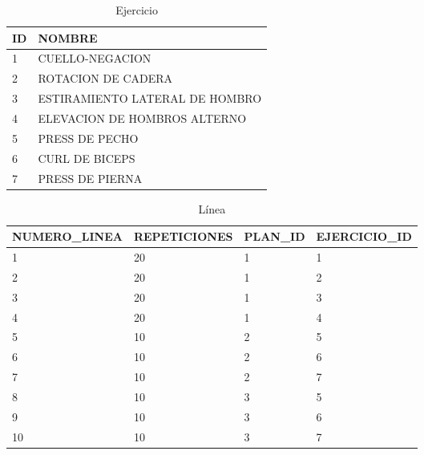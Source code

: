 \documentclass[12pt, a4paper]{article}
\begin{document}
	\begin{table}[H]
		\centering
		\caption{Ejercicio}
		\begin{tabular}{@{} m{0.5cm} m{14.5cm} @{}}
			\toprule
			\textbf{ID} & \textbf{NOMBRE}                \\ \midrule
			1           & CUELLO-NEGACION                \\
			2           & ROTACION DE CADERA             \\
			3           & ESTIRAMIENTO LATERAL DE HOMBRO \\
			4           & ELEVACION DE HOMBROS ALTERNO   \\
			5           & PRESS DE PECHO                 \\
			6           & CURL DE BICEPS                 \\
			7           & PRESS DE PIERNA                \\ \bottomrule
		\end{tabular}
	\end{table}
	\begin{table}[H]
		\centering
		\caption{Línea}
		\begin{tabular}{@{}m{4cm} m{} m{2.4cm} m{3.6cm}@{}}
			\toprule
			\textbf{NUMERO\_LINEA} & \textbf{REPETICIONES} & \textbf{PLAN\_ID} & \textbf{EJERCICIO\_ID} \\ \midrule
			1                      & 20                    & 1                 & 1                      \\
			2                      & 20                    & 1                 & 2                      \\
			3                      & 20                    & 1                 & 3                      \\
			4                      & 20                    & 1                 & 4                      \\
			5                      & 10                    & 2                 & 5                      \\
			6                      & 10                    & 2                 & 6                      \\
			7                      & 10                    & 2                 & 7                      \\
			8                      & 10                    & 3                 & 5                      \\
			9                      & 10                    & 3                 & 6                      \\
			10                     & 10                    & 3                 & 7                      \\ \bottomrule
		\end{tabular}
	\end{table}
	
\end{document}
